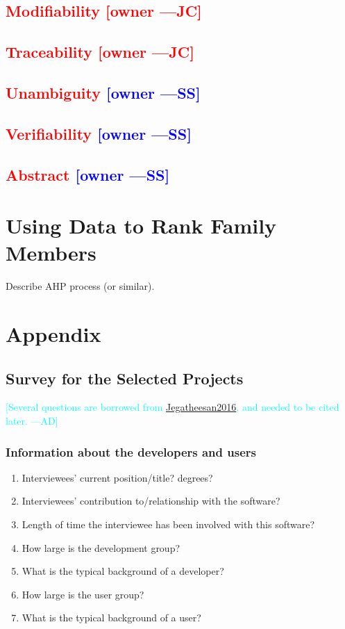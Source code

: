 \documentclass[letterpaper,cleveref]{lipics-v2019}
\newcommand{\authornote}[3]{\textcolor{#1}{[#3 ---#2]}}
\newcommand{\authornote}[3]{}
\newcommand{\wss}[1]{\authornote{blue}{SS}{#1}} %
\newcommand{\jc}[1]{\authornote{red}{JC}{#1}} %
\newcommand{\ad}[1]{\authornote{cyan}{AD}{#1}} %
\newcommand{\notdone}[1]{\textcolor{red}{#1}}
\theoremstyle{definition}
\begin{document}
\subsection{\notdone{Modifiability} \jc{owner}}

\subsection{\notdone{Traceability} \jc{owner}}

\subsection{\notdone{Unambiguity} \wss{owner}}

\subsection{\notdone{Verifiability} \wss{owner}}

\subsection{\notdone{Abstract} \wss{owner}}

\section{Using Data to Rank Family Members}

Describe AHP process (or similar).

\appendix
\section{Appendix}
\subsection{Survey for the Selected Projects}
\ad{Several questions are borrowed from \href{https://gitlab.cas.mcmaster.ca/smiths/pub/-/blob/master/Jegatheesan2016.pdf}{Jegatheesan2016}, and needed to be cited later.}
\subsubsection{Information about the developers and users}
\begin{enumerate}
\item Interviewees' current position/title? degrees?
\item Interviewees' contribution to/relationship with the software?
\item Length of time the interviewee has been involved with this software?
\item How large is the development group?
\item What is the typical background of a developer?
\item How large is the user group?
\item What is the typical background of a user?
\end{enumerate}
\end{document}
